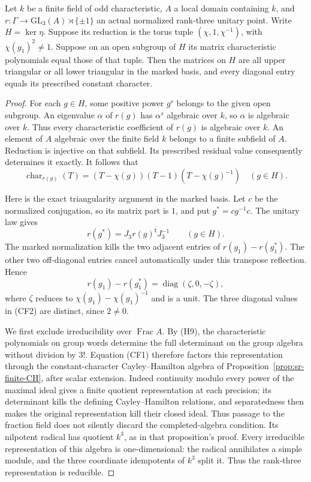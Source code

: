 \begin{srlemma}\label{lem:sr-constant-character-triangular}
Let \(k\) be a finite field of odd characteristic,
\(A\) a local domain containing \(k\), and
\(r:\Gamma\to\mathrm{GL}_3(A)\rtimes\{\pm1\}\)
an actual normalized rank-three unitary point.
Write \(H=\ker\eta\).
Suppose its reduction is the torus tuple
\((\chi,1,\chi^{-1})\), with \(\chi(g_1)^2\ne1\).
Suppose on an open subgroup of \(H\) its matrix
characteristic polynomials equal those of that tuple.
Then the matrices on \(H\) are all upper triangular
or all lower triangular in the marked basis, and every
diagonal entry equals its prescribed constant character.
\end{srlemma}
\begin{proof}
For each \(g\in H\), some positive power \(g^s\)
belongs to the given open subgroup.
An eigenvalue \(\alpha\) of \(r(g)\) has \(\alpha^s\)
algebraic over \(k\), so \(\alpha\) is algebraic over \(k\).
Thus every characteristic coefficient of \(r(g)\)
is algebraic over \(k\).
An element of \(A\) algebraic over the finite field \(k\)
belongs to a finite subfield of \(A\).
Reduction is injective on that subfield.
Its prescribed residual value consequently determines it
exactly.
It follows that
\[
 \operatorname{char}_{r(g)}(T)
                   =(T-\chi(g))(T-1)(T-\chi(g)^{-1})
                                \quad(g\in H).
 \tag{CF1}
\]

Here is the exact triangularity argument in the marked basis.
Let \(c\) be the normalized conjugation, so its matrix
part is \(1\), and put \(g^*=cg^{-1}c\).
The unitary law gives
\[
 r(g^*)=J_3r(g)^{\mathsf t}J_3^{-1}\qquad(g\in H).
\]
The marked normalization kills the two adjacent entries
of \(r(g_1)-r(g_1^*)\).
The other two off-diagonal entries cancel automatically
under this transpose reflection.
Hence
\[
             r(g_1)-r(g_1^*)=\operatorname{diag}(\zeta,0,-\zeta),
 \tag{CF2}
\]
where \(\zeta\) reduces to
\(\chi(g_1)-\chi(g_1)^{-1}\) and is a unit.
The three diagonal values in (CF2) are distinct,
since \(2\ne0\).

We first exclude irreducibility over \(\operatorname{Frac}A\).
By (H9), the characteristic polynomials on group words
determine the full determinant on the group algebra
without division by \(3!\).
Equation (CF1) therefore factors this representation
through the constant-character Cayley--Hamilton algebra
of Proposition~\ref{prop:sr-finite-CH}, after scalar extension.
Indeed continuity modulo every power of the maximal
ideal gives a finite quotient representation at each
precision; its determinant kills the defining
Cayley--Hamilton relations, and separatedness then makes
the original representation kill their closed ideal.
Thus passage to the fraction field does not silently
discard the completed-algebra condition.
Its nilpotent radical has quotient \(k^3\), as in that
proposition's proof.
Every irreducible representation of this algebra is
one-dimensional: the radical annihilates a simple module,
and the three coordinate idempotents of \(k^3\) split it.
Thus the rank-three representation is reducible.


\end{proof}
